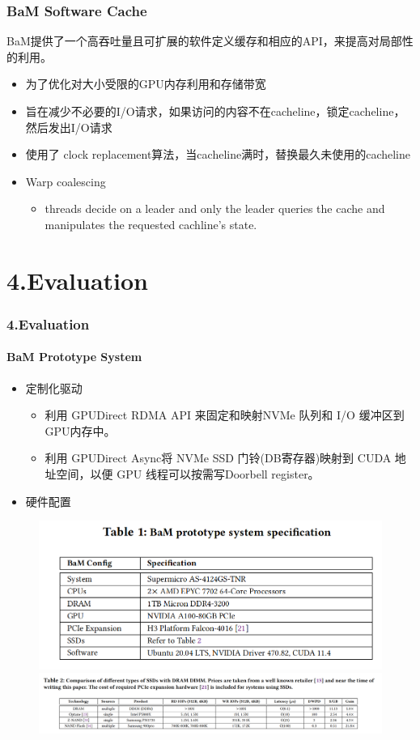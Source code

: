 \documentclass[10pt]{ctexbeamer}
\begin{document}
\begin{frame}
  \frametitle{BaM Software Cache}
  BaM提供了一个高吞吐量且可扩展的软件定义缓存和相应的API，来提高对局部性的利用。
  \begin{itemize}
    \item 为了优化对大小受限的GPU内存利用和存储带宽
    \item 旨在减少不必要的I/O请求，如果访问的内容不在cacheline，锁定cacheline，然后发出I/O请求
    \item 使用了 clock replacement算法，当cacheline满时，替换最久未使用的cacheline
    \item Warp coalescing 
    \begin{itemize}
      \item threads decide on a leader and only the leader queries the cache and manipulates the requested cachline's state.
    \end{itemize}
  \end{itemize}
\end{frame}


\section[4.Evaluation]{4.Evaluation}\label{sec:4}

\begin{frame}
  \frametitle{4.Evaluation}
  \framesubtitle{BaM Prototype System}
  \begin{itemize}
    \item 定制化驱动
    \begin{itemize}
      \item 利用 GPUDirect RDMA API 来固定和映射NVMe 队列和 I/O 缓冲区到GPU内存中。
      \item 利用 GPUDirect Async将 NVMe SSD 门铃(DB寄存器)映射到 CUDA 地址空间，以便 GPU 线程可以按需写Doorbell register。
    \end{itemize}
    \item 硬件配置
  \end{itemize}
  \begin{figure}
    \centering
    \includegraphics[width=.5\textwidth, height=.5\textheight, keepaspectratio]{images/systab.png}
    \includegraphics[width=.8\textwidth, height=.4\textheight, keepaspectratio]{images/SSD.png}
  \end{figure}
\end{frame}
\end{document}

